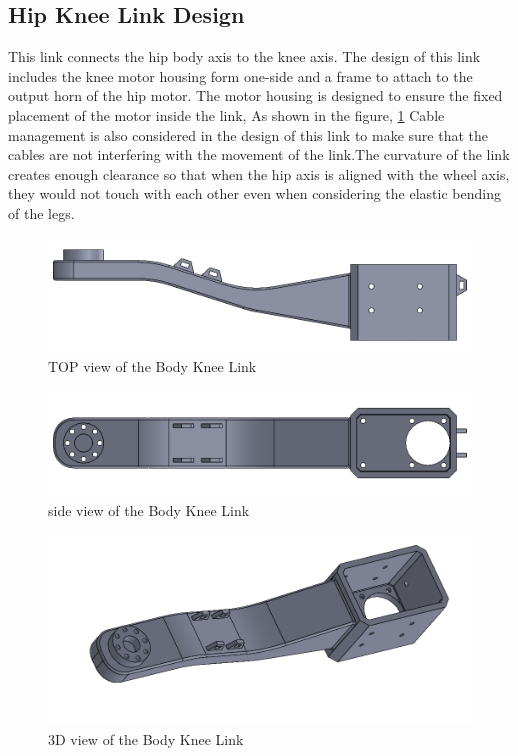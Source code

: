 \subsection{Hip Knee Link Design}
This link connects the hip body axis to the knee axis.
The design of this link includes the knee motor housing form one-side and a frame to attach to the output horn of the hip motor.
The motor housing is designed to ensure the fixed placement of the motor inside the link, As shown in the figure, \ref{fig:bodykneelink1} Cable management is also considered in the design of this link to make sure that the cables are not interfering with the movement of the link.The curvature of the link creates enough clearance so that when the hip axis is aligned with the wheel axis, they would not touch with each other even when considering the elastic bending of the legs.
\begin{figure}[h]
	\centering
	\includegraphics[width=1\linewidth]{Body_Knee_Link_1}
	\caption[TOP view of the Body Knee Link]{TOP view of the Body Knee Link}
	\label{fig:bodykneelink1}
\end{figure}
\begin{figure}[h]
	\centering
	\includegraphics[width=1\linewidth]{Body_Knee_Link_2}
	\caption[Side view of the Body Knee Link]{side view of the Body Knee Link}
	\label{fig:bodykneelink2}
\end{figure}
\begin{figure}[h]
	\centering
	\includegraphics[width=1\linewidth]{Body_Knee_Link_3}
	\caption[3D view of the Body Knee Link]{3D view of the Body Knee Link}
	\label{fig:bodykneelink3}
\end{figure}


